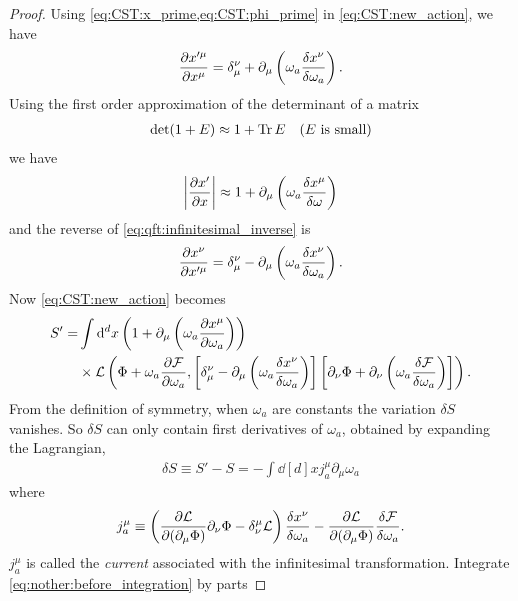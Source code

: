 \documentclass[10pt]{article}
\begin{document}
\begin{proof}
    Using \cref{eq:CST:x_prime,eq:CST:phi_prime} in \cref{eq:CST:new_action}, we have 
    \begin{align}
        \pdv{x'^\mu}{x^\mu}=\delta^\nu_\mu+\partial_\mu\left(\omega_a\fdv{x^\nu}{\omega_a}\right).\label{eq:qft:infinitesimal_inverse}
    \end{align}
    Using the first order approximation of the determinant of a matrix 
    \begin{align}
        \det(1+E)\approx1+\Tr E\quad(E\ \text{is small})
    \end{align}
    we have 
    \begin{align}
        \abs{\pdv{x'}{x}}\approx1+\partial_\mu\left(\omega_a\fdv{x^\mu}{\omega}\right)
    \end{align}
    and the reverse of \cref{eq:qft:infinitesimal_inverse} is 
    \begin{align}
        \pdv{x^\nu}{x'^\mu}=\delta^\nu_\mu-\partial_\mu\left(\omega_a\fdv{x^\nu}{\omega_a}\right).
    \end{align}
    Now \cref{eq:CST:new_action} becomes 
    \begin{align}
        S'=&\int\dd[d]{x}\left(1+\partial_\mu\left(\omega_a\pdv{x^\mu}{\omega_a}\right)\right)\notag\\
            &\times\mathcal{L}\left(\Phi+\omega_a\pdv{\mathcal{F}}{\omega_a},\left[\delta^\nu_\mu-\partial_\mu\left(\omega_a\fdv{x^\nu}{\omega_a}\right)\right]\left[\partial_\nu\Phi+\partial_\nu\left(\omega_a\fdv{\mathcal{F}}{\omega_a}\right)\right]\right).
    \end{align}
    From the definition of symmetry, when $\omega_a$ are constants the variation $\delta S$ vanishes.
    So $\delta S$ can only contain first derivatives of $\omega_a$, obtained by expanding the Lagrangian, 
    \begin{align}
        \delta S\equiv S'-S=-\int\dd[d]{x}j^\mu_a\partial_\mu\omega_a\label{eq:nother:before_integration}
    \end{align}
    where 
    \begin{align}
        j^\mu_a\equiv\left(\pdv{\mathcal{L}}{(\partial_\mu\Phi)}\partial_\nu\Phi-\delta^\mu_\nu\mathcal{L}\right)\fdv{x^\nu}{\omega_a}-\pdv{\mathcal{L}}{(\partial_\mu\Phi)}\fdv{\mathcal{F}}{\omega_a}.\label{eq:nother:canonical_current}
    \end{align}
    $j^\mu_a$ is called the \textit{current} associated with the infinitesimal transformation.
    Integrate \cref{eq:nother:before_integration} by parts

\end{proof}
\end{document}
